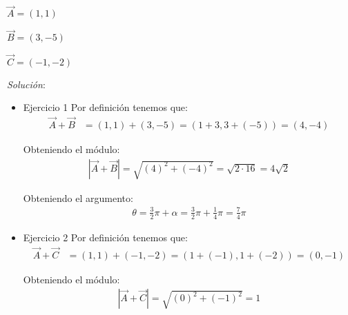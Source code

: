 \documentclass[12pt,openany]{book}
\begin{document}
	    	\begin{multicols}{3}
       			$\vec{A}=(1,1)$
       			\columnbreak

       			$\vec{B}=(3,-5)$
       			\columnbreak
       			
       			$\vec{C}=(-1,-2)$
	    	\end{multicols} 
	    	\noindent\textsl{Soluci\'on}:\\
	    	\begin{itemize}
		    	\item Ejercicio 1
		    	\noindent Por definici\'on tenemos que:
		    	\begin{equation*}
			    	\begin{split}
						\vec{A}+\vec{B} &=(1,1) + (3,-5) 
		    			=(1 + 3 , 3 + (-5)) 
		    			=(4, -4)
					\end{split}
				\end{equation*}

				\noindent Obteniendo el m\'odulo:\\
				\begin{equation*}
			    	\begin{split}
						|\vec{A}+\vec{B}|= \sqrt{(4)^{2}+(-4)^{2}}
						=\sqrt{2\cdot16}
						=4\sqrt{2}
					\end{split}
				\end{equation*}

				\noindent Obteniendo el argumento:\\
				\begin{equation*}
			    	\begin{split}
			    		\theta = \frac{3}{2}\pi + \alpha
			    		=\frac{3}{2}\pi + \frac{1}{4}\pi
			    		=\frac{7}{4}\pi
					\end{split}
				\end{equation*}

				\item Ejercicio 2
		    	\noindent Por definici\'on tenemos que:
		    	\begin{equation*}
			    	\begin{split}
						\vec{A}+\vec{C} &=(1,1) + (-1,-2) 
		    			=(1 +(-1) , 1 + (-2)) 
		    			=(0, -1)
					\end{split}
				\end{equation*}

				\noindent Obteniendo el m\'odulo:\\
				\begin{equation*}
			    	\begin{split}
						|\vec{A}+\vec{C}|= \sqrt{(0)^{2}+(-1)^{2}}
						=1
					\end{split}
				\end{equation*}


\end{itemize}
\end{document}
